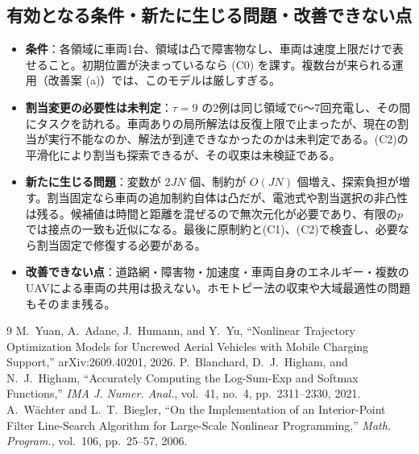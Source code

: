 \documentclass[uplatex,dvipdfmx,a4paper,11pt,jafont=haranoaji]{bxjsarticle}
\newcommand{\answerpart}[1]{\par\Needspace{6\baselineskip}\subsection*{#1}}
\begin{document}
\answerpart{有効となる条件・新たに生じる問題・改善できない点}
\begin{itemize}
  \item \textbf{条件}：各領域に車両1台、領域は凸で障害物なし、車両は速度上限だけで表せること。初期位置が決まっているなら (C0) を課す。複数台が来られる運用（改善案 (a)）では、このモデルは厳しすぎる。
  \item \textbf{割当変更の必要性は未判定}：$\tau=9$ の2例は同じ領域で6〜7回充電し、その間にタスクを訪れる。車両ありの局所解法は反復上限で止まったが、現在の割当が実行不能なのか、解法が到達できなかったのかは未判定である。(C2)の平滑化により割当も探索できるが、その収束は未検証である。
  \item \textbf{新たに生じる問題}：変数が $2JN$ 個、制約が $O(JN)$ 個増え、探索負担が増す。割当固定なら車両の追加制約自体は凸だが、電池式や割当選択の非凸性は残る。候補値は時間と距離を混ぜるので無次元化が必要であり、有限の$p$では接点の一致も近似になる。最後に原制約と(C1)、(C2)で検査し、必要なら割当固定で修復する必要がある。
  \item \textbf{改善できない点}：道路網・障害物・加速度・車両自身のエネルギー・複数のUAVによる車両の共用は扱えない。ホモトピー法の収束や大域最適性の問題もそのまま残る。
\end{itemize}

\FloatBarrier
{\small\renewcommand{\Needspace}[1]{}%
\begin{thebibliography}{9}
 M.~Yuan, A.~Adane, J.~Humann, and Y.~Yu, ``Nonlinear Trajectory Optimization Models for Uncrewed Aerial Vehicles with Mobile Charging Support,'' arXiv:2609.40201, 2026.
 P.~Blanchard, D.~J.~Higham, and N.~J.~Higham, ``Accurately Computing the Log-Sum-Exp and Softmax Functions,'' \textit{IMA J. Numer. Anal.}, vol.~41, no.~4, pp.~2311--2330, 2021.
 A.~W\"achter and L.~T.~Biegler, ``On the Implementation of an Interior-Point Filter Line-Search Algorithm for Large-Scale Nonlinear Programming,'' \textit{Math. Program.}, vol.~106, pp.~25--57, 2006.
\end{thebibliography}}
\end{document}
